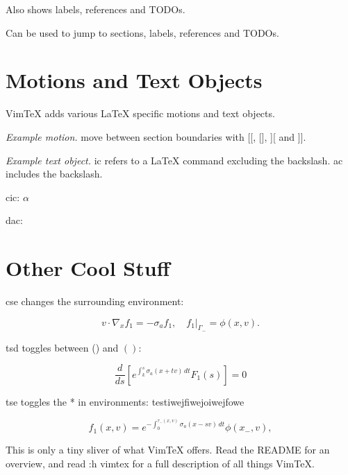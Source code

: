 \documentclass{article}
\begin{document}
Also shows labels, references and TODOs. 

Can be used to jump to sections, labels, references and TODOs.












\section{Motions and Text Objects}

VimTeX adds various LaTeX specific motions and text objects.

\emph{Example motion.} move between section boundaries with [[, [], ][ and ]].

\emph{Example text object.} ic refers to a LaTeX command excluding the
backslash. ac includes the backslash.

cic: \( \alpha \)

dac: \(  \)











\section{Other Cool Stuff}

cse changes the surrounding environment:

\begin{equation}
  v \cdot \nabla_x f_1 = -\sigma_a f_1, \quad f_1 \rvert_{\Gamma_-} = \phi(x,v).
\end{equation}

tsd toggles between () and \( \left( \right) \):

\begin{equation*}
  \frac{d}{ds} \left[ e^{\int_k^s \sigma_a(x + tv)\,dt} F_1(s) \right] = 0
\end{equation*}

tse toggles the * in environments:
testiwejfiwejoiwejfowe

\begin{equation}
  f_1(x, v) = e^{-\int_0^{\tau_-(x, v)} \sigma_a(x - sv)\,dt} \phi(x_-, v),
\end{equation}

This is only a tiny sliver of what VimTeX offers.
Read the README for an overview, and read :h vimtex for a full description of
all things VimTeX.
\end{document}
